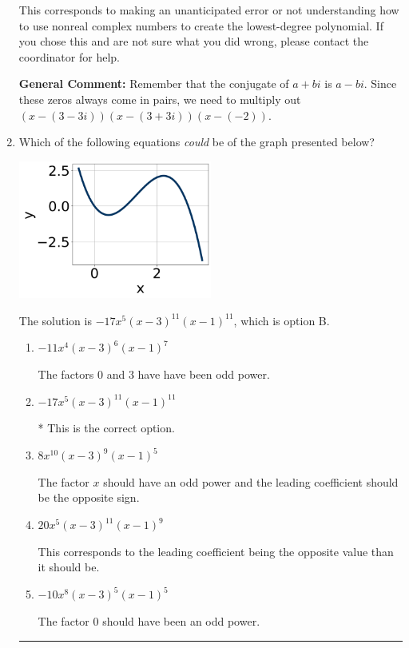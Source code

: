 \documentclass{extbook}[14pt]
\newcommand{\litem}[1]{\item #1

\rule{\textwidth}{0.4pt}}
\begin{document}
\begin{enumerate}
{\begin{enumerate}[label=\Alph*.]
This corresponds to making an unanticipated error or not understanding how to use nonreal complex numbers to create the lowest-degree polynomial. If you chose this and are not sure what you did wrong, please contact the coordinator for help.
\end{enumerate}

\textbf{General Comment:} Remember that the conjugate of $a+bi$ is $a-bi$. Since these zeros always come in pairs, we need to multiply out $(x-(3 - 3 i))(x-(3 + 3 i))(x-(-2))$.
}
\litem{
Which of the following equations \textit{could} be of the graph presented below?

\begin{center}
    \includegraphics[width=0.5\textwidth]{../Figures/polyGraphToFunctionC.png}
\end{center}


The solution is \( -17x^{5} (x - 3)^{11} (x - 1)^{11} \), which is option B.\begin{enumerate}[label=\Alph*.]
\item \( -11x^{4} (x - 3)^{6} (x - 1)^{7} \)

The factors $0$ and $3$ have have been odd power.
\item \( -17x^{5} (x - 3)^{11} (x - 1)^{11} \)

* This is the correct option.
\item \( 8x^{10} (x - 3)^{9} (x - 1)^{5} \)

The factor $x$ should have an odd power and the leading coefficient should be the opposite sign.
\item \( 20x^{5} (x - 3)^{11} (x - 1)^{9} \)

This corresponds to the leading coefficient being the opposite value than it should be.
\item \( -10x^{8} (x - 3)^{5} (x - 1)^{5} \)

The factor $0$ should have been an odd power.
\end{enumerate}

}
\end{enumerate}
\end{document}
